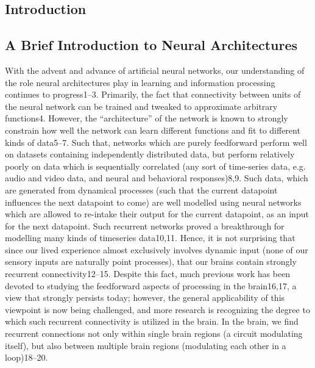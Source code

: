 \begin{refsection}

\chapter{Introduction}

\section{A Brief Introduction to Neural Architectures}
With the advent and advance of artificial neural networks, our understanding of the role neural architectures play in learning and information processing continues to progress1–3. Primarily, the fact that connectivity between units of the neural network can be trained and tweaked to approximate arbitrary functions4. However, the “architecture” of the network is known to strongly constrain how well the network can learn different functions and fit to different kinds of data5–7. Such that, networks which are purely feedforward perform well on datasets containing independently distributed data, but perform relatively poorly on data which is sequentially correlated (any sort of time-series data, e.g. audio and video data, and neural and behavioral responses)8,9. Such data, which are generated from dynamical processes (such that the current datapoint influences the next datapoint to come) are well modelled using neural networks which are allowed to re-intake their output for the current datapoint, as an input for the next datapoint. Such recurrent networks proved a breakthrough for modelling many kinds of timeseries data10,11. Hence, it is not surprising that since our lived experience almost exclusively involves dynamic input (none of our sensory inputs are naturally point processes), that our brains contain strongly recurrent connectivity12–15. 
Despite this fact, much previous work has been devoted to studying the feedforward aspects of processing in the brain16,17, a view that strongly persists today; however, the general applicability of this viewpoint is now being challenged, and more research is recognizing the degree to which such recurrent connectivity is utilized in the brain. In the brain, we find recurrent connections not only within single brain regions (a circuit modulating itself), but also between multiple brain regions (modulating each other in a loop)18–20.


\end{refsection}
